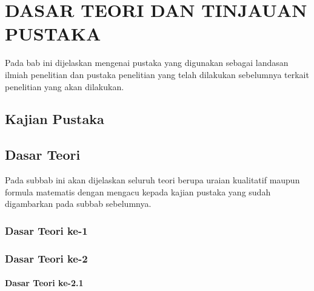 %
%
%
%
%

\chapter{DASAR TEORI DAN TINJAUAN PUSTAKA}

Pada bab ini dijelaskan mengenai pustaka yang digunakan sebagai landasan ilmiah penelitian dan pustaka penelitian yang telah dilakukan sebelumnya terkait penelitian yang akan dilakukan.

\section{Kajian Pustaka}

\blindtext

\section{Dasar Teori}

Pada subbab ini akan dijelaskan seluruh teori berupa uraian kualitatif
maupun formula matematis dengan mengacu kepada kajian pustaka yang sudah digambarkan pada subbab sebelumnya.

\subsection{Dasar Teori ke-1}

\blindtext

\subsection{Dasar Teori ke-2}

\blindtext

\subsubsection{Dasar Teori ke-2.1}

